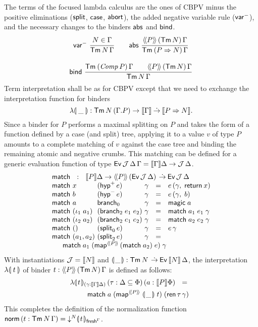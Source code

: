\documentclass[sigplan,screen,fleqn,review]{acmart} %
\begin{document}
The terms  of the focused lambda calculus are the
ones of CBPV minus the positive eliminations ($\tsplit$, $\tcase$,
$\tabort$), the added negative variable rule ($\nvar$), and the
necessary changes to the binders $\tabs$ and $\tbind$.
\begin{gather*}
  \nru{\nvar}{N \in \Gamma}{\Tm N \Gamma}
\qquad
  \nru{\tabs}
      {\AddHypP P {\tTm\, N} \Gamma}
      {\TmP {P \To N} \Gamma}
\\[2ex]
  \nru{\tbind}
      {\TmP {\Comp P} \Gamma \qquad \AddHypP P {\tTm\,N} \Gamma}
      {\Tm N \Gamma}
\end{gather*}
Term interpretation
shall be as for CBPV except that we need to exchange the
interpretation function for binders
\[
\fden\_ : \Tm N {(\cext
    \Gamma P)} \to \den \Gamma \todot \den{P \To N}
.\]
Since a binder
for $P$ performs a maximal splitting on $P$ and takes the form of a
function defined by a case (and split) tree,
applying it to a value $v$ of type $P$ amounts to a complete
matching of $v$ against the case tree and binding the remaining
atomic and negative crumbs.  This matching can be defined for a
generic evaluation function of type
$\Evvv \J \Delta \Gamma = \den \Gamma \Delta \to \J\,\Delta$.
\[
\begin{array}{l@{~}l@{~}l@{~}lcl}
  \multicolumn 6 {l} {\tmatch ~~:~~ \den P \Delta \to
    \AddHypP P {\Evv \J \Delta} \todot \Evv \J \Delta }\\
  \tmatch & x & (\phyp\,e) & \gamma & = & e\,(\gamma,\; \treturn\,x) \\
  \tmatch & b & (\nhyp\,e) & \gamma & = & e\,(\gamma,\; b) \\
  \tmatch & a & \nbranch & \gamma & = & \tmagic\;a \\
  \tmatch & (\iota_1\;a_1) & (\bbranch\;e_1\;e_2) & \gamma & = &
    \tmatch\;a_1\;e_1\;\gamma \\
  \tmatch & (\iota_2\;a_2) & (\bbranch\;e_1\;e_2) & \gamma & = &
    \tmatch\;a_2\;e_2\;\gamma \\
  \tmatch & \ttempty & (\nsplit\,e) & \gamma & = & e\,\gamma \\
  \tmatch & (a_1,a_2) & (\bsplit\,e) & \gamma & = &
\\ \multicolumn 6 {@{\qquad}l}{
    \tmatch\;a_1\;(\tmap[\Add P]\,(\tmatch\;a_2)\;e)\;\gamma
}
\\
\end{array}
\]
With instantiations $\J = \den N$ and
$\denty\_ : \Tm N \todot \Evv {\den N} \Delta$,
the interpretation $\fden t$
of binder $t : \AddHypP P {\tTm\,N} \Gamma$
is defined as follows:
\begin{multline*}
  \fdent{t}
    {(\gamma : \den \Gamma \Delta)}
    \, (\tau : \Delta \sublist \Phi)
    \, (a : \den P \Phi)
    ~~=~~
\\ \qquad
    \tmatch
      \; a
      \; (\tmap[\Add P]\;\denty\_\;t)
      \; (\tren\,\tau\,\gamma)
\end{multline*}
This completes the definition of the normalization function
$\tnorm\, (t : \Tm N \Gamma)
  = \down N \dent t {\idenv\Gamma}$.
\end{document}
